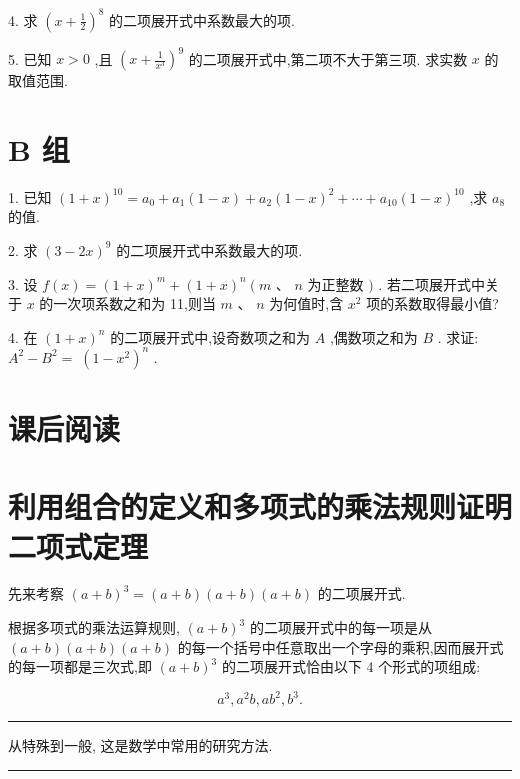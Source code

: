\documentclass[10pt]{article}
\newcommand{\HRule}{\begin{center}\rule{0.9\linewidth}{0.2mm}\end{center}}
\begin{document}
4. 求 \({\left( x + \frac{1}{2}\right) }^{8}\) 的二项展开式中系数最大的项.

5. 已知 \(x > 0\) ,且 \({\left( x + \frac{1}{{x}^{3}}\right) }^{9}\) 的二项展开式中,第二项不大于第三项. 求实数 \(x\) 的取值范围.

\section*{B 组}

1. 已知 \({\left( 1 + x\right) }^{10} = {a}_{0} + {a}_{1}\left( {1 - x}\right)  + {a}_{2}{\left( 1 - x\right) }^{2} + \cdots  + {a}_{10}{\left( 1 - x\right) }^{10}\) ,求 \({a}_{8}\) 的值.

2. 求 \({\left( 3 - 2x\right) }^{9}\) 的二项展开式中系数最大的项.

3. 设 \(f\left( x\right)  = {\left( 1 + x\right) }^{m} + {\left( 1 + x\right) }^{n}\left( {m\text{ 、 }n}\right.\) 为正整数 \()\) . 若二项展开式中关于 \(x\) 的一次项系数之和为 11,则当 \(m\text{ 、 }n\) 为何值时,含 \({x}^{2}\) 项的系数取得最小值?

4. 在 \({\left( 1 + x\right) }^{n}\) 的二项展开式中,设奇数项之和为 \(A\) ,偶数项之和为 \(B\) . 求证: \({A}^{2} - {B}^{2} = \; {\left( 1 - {x}^{2}\right) }^{n}\) .



\section*{课后阅读}

\section*{利用组合的定义和多项式的乘法规则证明二项式定理}

先来考察 \({\left( a + b\right) }^{3} = \left( {a + b}\right) \left( {a + b}\right) \left( {a + b}\right)\) 的二项展开式.

根据多项式的乘法运算规则, \({\left( a + b\right) }^{3}\) 的二项展开式中的每一项是从 \(\left( {a + b}\right) \left( {a + b}\right) \left( {a + b}\right)\) 的每一个括号中任意取出一个字母的乘积,因而展开式的每一项都是三次式,即 \({\left( a + b\right) }^{3}\) 的二项展开式恰由以下 4 个形式的项组成:

\[
{a}^{3},{a}^{2}b,a{b}^{2},{b}^{3}.
\]

\HRule

从特殊到一般, 这是数学中常用的研究方法.

\HRule
\end{document}
